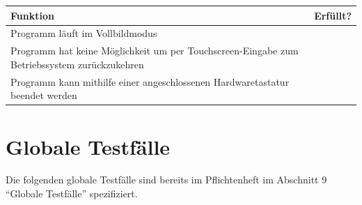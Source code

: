\documentclass{article}
\newcommand{\cmark}{\ding{51}}
\begin{document}
    \begin{table}[H]
      \begin{tabularx}{\textwidth}{| >{\raggedright\arraybackslash}X | c |}
        \hline
        \textbf{Funktion} & \textbf{Erfüllt?} \\
        \hline
        Programm läuft im Vollbildmodus & \cmark \\
        \hline
        Programm hat keine Möglichkeit um per Touchscreen-Eingabe zum Betriebssystem zurückzukehren & \cmark \\
        \hline
        Programm kann mithilfe einer angeschlossenen Hardwaretastatur beendet werden & \cmark \\
        \hline
      \end{tabularx}
    \end{table}
\clearpage

\section{Globale Testfälle}
  Die folgenden globale Testfälle sind bereits im Pflichtenheft im Abschnitt 9 ``Globale Testfälle'' spezifiziert.
  
\end{document}
